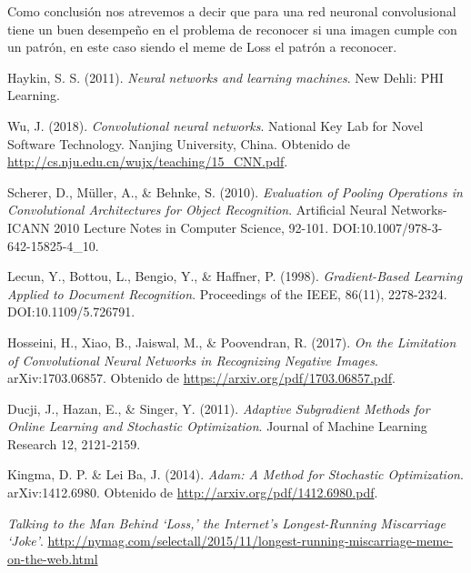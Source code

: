 \documentclass[spanish,11pt,letterpaper]{article}
\begin{document}
Como conclusión nos atrevemos a decir que para una red neuronal convolusional tiene un buen desempeño en el
problema de reconocer si una imagen cumple con un patrón, en este caso siendo el meme de Loss el patrón a
reconocer.

\begin{thebibliography}{9}
Haykin, S. S. (2011).
\textit{Neural networks and learning machines}.
New Dehli: PHI Learning.

Wu, J. (2018).
\textit{Convolutional neural networks}.
National Key Lab for Novel Software Technology. Nanjing University, China.
Obtenido de \url{http://cs.nju.edu.cn/wujx/teaching/15_CNN.pdf}.

Scherer, D., M\"uller, A., \& Behnke, S. (2010).
\textit{Evaluation of Pooling Operations in Convolutional Architectures for Object Recognition}.
Artificial Neural Networks-ICANN 2010 Lecture Notes in Computer Science, 92-101. DOI:10.1007/978-3-642-15825-4\_10.

Lecun, Y., Bottou, L., Bengio, Y., \& Haffner, P. (1998).
\textit{Gradient-Based Learning Applied to Document Recognition}.
Proceedings of the IEEE, 86(11), 2278-2324. DOI:10.1109/5.726791.

Hosseini, H., Xiao, B., Jaiswal, M., \& Poovendran, R. (2017).
\textit{On the Limitation of Convolutional Neural Networks in Recognizing Negative Images}.
arXiv:1703.06857. Obtenido de \url{https://arxiv.org/pdf/1703.06857.pdf}.

Ducji, J., Hazan, E., \& Singer, Y. (2011).
\textit{Adaptive Subgradient Methods for Online Learning and Stochastic Optimization}.
Journal of Machine Learning Research 12, 2121-2159.

Kingma, D. P. \& Lei Ba, J. (2014).
\textit{Adam: A Method for Stochastic Optimization}.
arXiv:1412.6980. Obtenido de \url{http://arxiv.org/pdf/1412.6980.pdf}.

\textit{Talking to the Man Behind `Loss,' the Internet's Longest-Running Miscarriage `Joke'}.
\url{http://nymag.com/selectall/2015/11/longest-running-miscarriage-meme-on-the-web.html}

\end{thebibliography}
\end{document}

